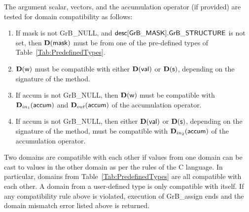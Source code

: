 The argument scalar, vectors, and the accumulation 
operator (if provided) are tested for domain compatibility as follows:
\begin{enumerate}
	\item If {\sf mask} is not {\sf GrB\_NULL}, and ${\sf desc[GrB\_MASK].GrB\_STRUCTURE}$
    is not set, then $\bold{D}({\sf mask})$ must be from one of the pre-defined types of 
    Table~\ref{Tab:PredefinedTypes}.

	\item $\bold{D}({\sf w})$ must be 
    compatible with either $\bold{D}({\sf val})$ or $\bold{D}({\sf s})$, depending
	on the signature of the method.

	\item If {\sf accum} is not {\sf GrB\_NULL}, then $\bold{D}({\sf w})$ must be
    compatible with $\mbox{$\mathbf{D}_{in_{1}}$}({\sf accum})$ and $\mbox{$\mathbf{D}_{out}$}({\sf accum})$ of the accumulation operator.
	
    \item If {\sf accum} is not {\sf GrB\_NULL}, then  
    either $\bold{D}({\sf val})$ or $\bold{D}({\sf s})$, depending on the signature of the method, must be compatible with $\mbox{$\mathbf{D}_{in_{2}}$}({\sf accum})$ of the accumulation operator.
\end{enumerate}
Two domains are compatible with each other if values from one domain can be cast 
to values in the other domain as per the rules of the C language.
In particular, domains from Table~\ref{Tab:PredefinedTypes} are all compatible 
with each other. A domain from a user-defined type is only compatible with itself.
If any compatibility rule above is violated, execution of {\sf GrB\_assign} ends
and the domain mismatch error listed above is returned.

